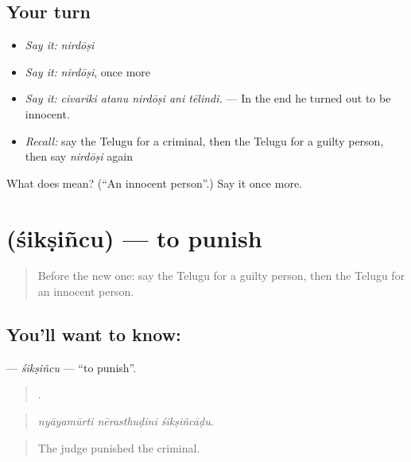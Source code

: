 \subsection*{Your turn}
\begin{itemize}
\raggedright
  \item \emph{Say it:} \emph{nirdōṣi}
  \item \emph{Say it:} \emph{nirdōṣi}, once more
  \item \emph{Say it:} \emph{civariki atanu nirdōṣi ani tēlindi.} — In the end he turned out to be innocent.
  \item \emph{Recall:} say the Telugu for a criminal, then the Telugu for a guilty person, then say \emph{nirdōṣi} again
\end{itemize}

\begin{tcolorbox}[breakable,colback=teal!4,colframe=teal!35!black,title={Before you move on}]
What does  mean? (\textquotedblleft{}An innocent person\textquotedblright{}.) Say it once more.
\end{tcolorbox}
\section[\texorpdfstring{\te{శిక్షించు} (śikṣiñcu)}{శిక్షించు (śikṣiñcu)}]{ (śikṣiñcu) — to punish}

\label{lesson:TE-C350-siksincu}



\begin{quote}
Before the new one: say the Telugu for a guilty person, then the Telugu for an innocent person.
\end{quote}

\subsection*{You'll want to know: }
\textbf{} — \emph{śikṣiñcu} — \textquotedblleft{}to punish\textquotedblright{}.

\begin{quote}
  .
\end{quote}

\begin{quote}
\emph{nyāyamūrti nērasthuḍini śikṣiñcāḍu.}
\end{quote}

\begin{quote}
The judge punished the criminal.
\end{quote}

